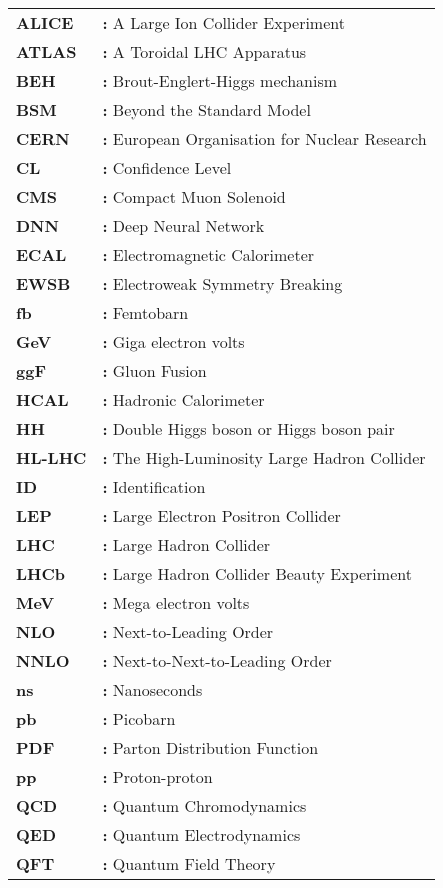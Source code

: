 \begin{tabular}{@{}p{2cm}l}
{\bf ALICE} & {\bf:} A Large Ion Collider Experiment\\
{\bf ATLAS} & {\bf:} A Toroidal LHC Apparatus\\
{\bf BEH} & {\bf:} Brout-Englert-Higgs mechanism\\
{\bf BSM} & {\bf:} Beyond the Standard Model\\
{\bf CERN} & {\bf:} European Organisation for Nuclear Research\\
{\bf CL} & {\bf:} Confidence Level\\
{\bf CMS} & {\bf:} Compact Muon Solenoid\\
{\bf DNN} & {\bf:} Deep Neural Network\\
{\bf ECAL} & {\bf:} Electromagnetic Calorimeter\\
{\bf EWSB} & {\bf:} Electroweak Symmetry Breaking\\
{\bf fb} & {\bf:} Femtobarn\\
{\bf GeV} & {\bf:} Giga electron volts\\
{\bf ggF} & {\bf:} Gluon Fusion\\
{\bf HCAL} & {\bf:} Hadronic Calorimeter\\
{\bf HH} & {\bf:} Double Higgs boson or Higgs boson pair\\
{\bf HL-LHC} & {\bf:} The High-Luminosity Large Hadron Collider\\
{\bf ID} & {\bf:} Identification\\
{\bf LEP} & {\bf:} Large Electron Positron Collider\\
{\bf LHC} & {\bf:} Large Hadron Collider\\
{\bf LHCb} & {\bf:} Large Hadron Collider Beauty Experiment\\
{\bf MeV} & {\bf:} Mega electron volts\\
{\bf NLO} & {\bf:} Next-to-Leading Order\\
{\bf NNLO} & {\bf:} Next-to-Next-to-Leading Order\\
{\bf ns} & {\bf:} Nanoseconds\\
{\bf pb} & {\bf:} Picobarn\\
{\bf PDF} & {\bf:} Parton Distribution Function\\
{\bf pp} & {\bf:} Proton-proton\\
{\bf QCD} & {\bf:} Quantum Chromodynamics\\
{\bf QED} & {\bf:} Quantum Electrodynamics\\
{\bf QFT} & {\bf:} Quantum Field Theory\\

\end{tabular}
